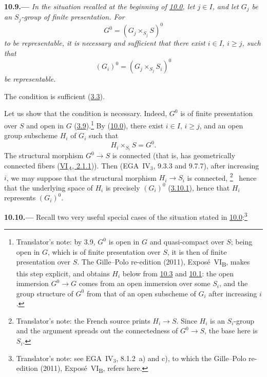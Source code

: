 
\medskip
{}\label{lem:sga3-VIB-10.9}%
\noindent\textbf{10.9.---}
\emph{In the situation recalled at the beginning of
\hyperref[par:sga3-VIB-10.0]{10.0}, let \(j\in I\), and let
\(G_j\) be an \(S_j\)-group of finite presentation. For
\[
  G^0=(G_j\times_{S_j}S)^0
\]
to be representable, it is necessary and sufficient that there
exist \(i\in I\), \(i\geq j\), such that
\[
  (G_i)^0=(G_j\times_{S_j}S_i)^0
\]
be representable.}

The condition is sufficient
\textup{(\hyperref[prop:sga3-VIB-3.3]{3.3})}.

Let us show that the condition is necessary. Indeed, \(G^0\) is
of finite presentation over \(S\) and open in \(G\)
\textup{(\hyperref[prop:sga3-VIB-3.9]{3.9})}.\footnote{Translator's note: by 3.9, \(G^0\) is open in \(G\) and
quasi-compact over \(S\); being open in \(G\), which is of finite presentation over \(S\), it is then of finite
presentation over \(S\). The Gille--Polo re-edition (2011), Expos\'e~VI\textsubscript{B}, makes this step
explicit, and obtains \(H_i\) below from \hyperref[lem:sga3-VIB-10.3]{10.3} and
\hyperref[par:sga3-VIB-10.1]{10.1}: the open immersion \(G^0\to G\) comes from an open immersion over some
\(S_i\), and the group structure of \(G^0\) from that of an open subscheme of \(G_i\) after increasing \(i\).}
By
\textup{(\hyperref[par:sga3-VIB-10.0]{10.0})}, there exist
\(i\in I\), \(i\geq j\), and an open group subscheme \(H_i\) of
\(G_i\) such that
\[
  H_i\times_{S_i}S=G^0.
\]
The structural morphism \(G^0\to S\) is connected \textup{(}that
is, has geometrically connected fibers
\textup{(\hyperref[prop:sga3-VIA-2.1.1]{VI\(_A\), 2.1.1}))}.
Then \textup{(}EGA~IV\(_3\), 9.3.3 and 9.7.7\textup{)}, after
increasing \(i\), we may suppose that the structural morphism
\(H_i\to S_i\) is connected,%
\begingroup
\renewcommand{\thefootnote}{\fnsymbol{footnote}}%
\footnote[1]{\label{note:sga3-VIB-10.9-Hi-base}
Translator's note: the French source prints \(H_i\to S\).
Since \(H_i\) is an \(S_i\)-group and the argument spreads out
the connectedness of \(G^0\to S\), the base here is \(S_i\).}%
\endgroup\ hence that the underlying space of \(H_i\) is precisely \((G_i)^0\)
\textup{(\hyperref[lem:sga3-VIB-3.10.1]{3.10.1})}, hence that \(H_i\) represents
\((G_i)^0\).

\medskip
{}\label{par:sga3-VIB-10.10}%
\noindent\textbf{10.10.---}
Recall two very useful special cases of the situation stated
in \hyperref[par:sga3-VIB-10.0]{10.0}:\footnote{Translator's note: see EGA~IV\(_3\), 8.1.2~a)
and c), to which the Gille--Polo re-edition (2011), Expos\'e~VI\textsubscript{B}, refers here.}

